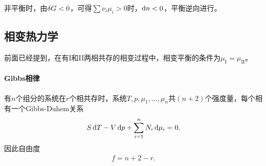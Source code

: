 非平衡时，由$\mathop{}\!\delta G<0$，可得$\textstyle\sum\nu_i\mu_i>0$时，$\mathop{}\!\mathrm{d} n<0$，平衡逆向进行。
\iffalse
考虑一个由理想气体参与的化学反应，理想气体的化学势
\[\mu_i=RT\ln p_i+\cns(T).\]
带入上式可得，有
\[\sum_{i=1}^r\nu_iRT\ln p_i=\cns(T).\]
又$p=RT\zkh{{\rm A}_i}$，%
\begin{align}
	\prod_{i=1}^r\zkh{{\rm A}_i}^{\nu_i}=:K(T).
\end{align}
$K$称为化学平衡常数，是$T$的函数。
\fi
\subsection{相变热力学}
前面已经提到，在有I和II两相共存的相变过程中，相变平衡的条件为$\mu_\mathrm I=\mu_\mathrm{II}$。

\paragraph*{Gibbs相律}有$n$个组分的系统在$r$个相共存时，系统$T,p,\mu_1,\ldots,\mu_n$共$(n+2)$个强度量，每个相有一个Gibbs-Duhem关系
\[S\mathop{}\!\mathrm{d} T-V\mathop{}\!\mathrm{d} p+\sum_{i=1}^nN_i\mathop{}\!\mathrm{d}\mu_i=0.\]
因此自由度
\begin{align}
	f=n+2-r.
\end{align}
